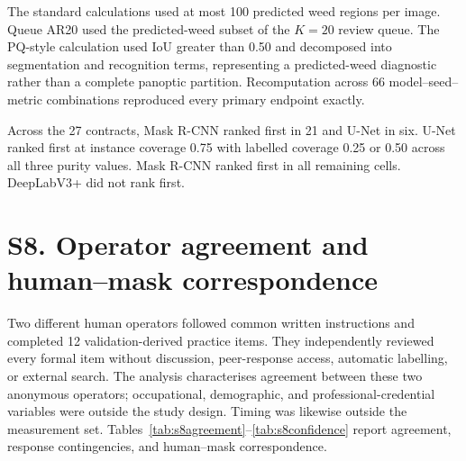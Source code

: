 \documentclass[preprint,12pt]{elsarticle}
\begin{document}
The standard calculations used at most 100 predicted weed regions per image. Queue AR20 used the predicted-weed subset of the $K=20$ review queue. The PQ-style calculation used IoU greater than 0.50 and decomposed into segmentation and recognition terms, representing a predicted-weed diagnostic rather than a complete panoptic partition. Recomputation across 66 model--seed--metric combinations reproduced every primary endpoint exactly.

Across the 27 contracts, Mask R-CNN ranked first in 21 and U-Net in six. U-Net ranked first at instance coverage 0.75 with labelled coverage 0.25 or 0.50 across all three purity values. Mask R-CNN ranked first in all remaining cells. DeepLabV3+ did not rank first.

\section{S8. Operator agreement and human--mask correspondence}

Two different human operators followed common written instructions and completed 12 validation-derived practice items. They independently reviewed every formal item without discussion, peer-response access, automatic labelling, or external search. The analysis characterises agreement between these two anonymous operators; occupational, demographic, and professional-credential variables were outside the study design. Timing was likewise outside the measurement set. Tables~\ref{tab:s8agreement}--\ref{tab:s8confidence} report agreement, response contingencies, and human--mask correspondence.

\begin{table}[htbp]
\centering
\caption{Agreement on 518 regions. AC1 intervals use 10,000 scene-cluster replicates.}
\label{tab:s8agreement}
\scriptsize
{}
\end{table}
\end{document}
